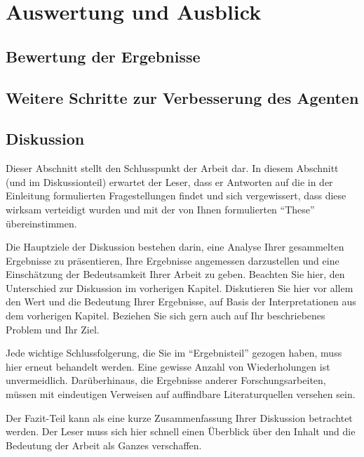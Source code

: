 

\clearpage
\chapter{Auswertung und Ausblick}


\section{Bewertung der Ergebnisse}
\section{Weitere Schritte zur Verbesserung des Agenten}
\section{Diskussion}

Dieser Abschnitt stellt den Schlusspunkt der Arbeit dar. In diesem Abschnitt (und im Diskussionteil) erwartet der Leser, 
dass er Antworten auf die in der Einleitung formulierten Fragestellungen findet und sich vergewissert, 
dass diese wirksam verteidigt wurden und mit der von Ihnen formulierten \enquote{These} übereinstimmen.

Die Hauptziele der Diskussion bestehen darin, eine Analyse Ihrer gesammelten Ergebnisse zu präsentieren, 
Ihre Ergebnisse angemessen darzustellen und eine Einschätzung der Bedeutsamkeit Ihrer Arbeit zu geben. Beachten Sie hier,
den Unterschied zur Diskussion im vorherigen Kapitel. Diskutieren Sie hier vor allem den Wert und die Bedeutung Ihrer Ergebnisse, auf Basis der 
Interpretationen aus dem vorherigen Kapitel. Beziehen Sie sich gern auch auf Ihr beschriebenes Problem und Ihr Ziel.

Jede wichtige Schlussfolgerung, die Sie im \enquote{Ergebnisteil} gezogen haben, 
muss hier erneut behandelt werden. Eine gewisse Anzahl von Wiederholungen ist unvermeidlich. Darüberhinaus, 
die Ergebnisse anderer Forschungsarbeiten, müssen mit eindeutigen Verweisen auf auffindbare Literaturquellen versehen sein.

Der Fazit-Teil kann als eine kurze Zusammenfassung Ihrer Diskussion betrachtet werden. 
Der Leser muss sich hier schnell einen Überblick über den Inhalt und die Bedeutung der Arbeit als Ganzes verschaffen.

